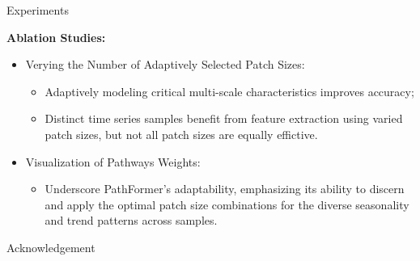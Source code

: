 \documentclass[12pt,aspectratio=169]{beamer}
\begin{document}
\begin{frame}{Experiments}

  \textbf{Ablation Studies:}

  \begin{itemize}

    \item Verying the Number of Adaptively Selected Patch Sizes:

    \begin{itemize}

      \item Adaptively modeling critical multi-scale characteristics improves 
      accuracy;

      \item Distinct time series samples benefit from feature extraction using 
      varied patch sizes, but not all patch sizes are equally effictive.

    \end{itemize}

    \item Visualization of Pathways Weights:

    \begin{itemize}

      \item Underscore PathFormer's adaptability, emphasizing its ability to
      discern and apply the optimal patch size combinations for the diverse
      seasonality and trend patterns across samples.

    \end{itemize}

  \end{itemize}

\end{frame}

\begin{frame}{Acknowledgement}

  \begin{center}

    \textcolor{gray}{\Huge{\centerline{}}}

  \end{center}

\end{frame}
\end{document}
